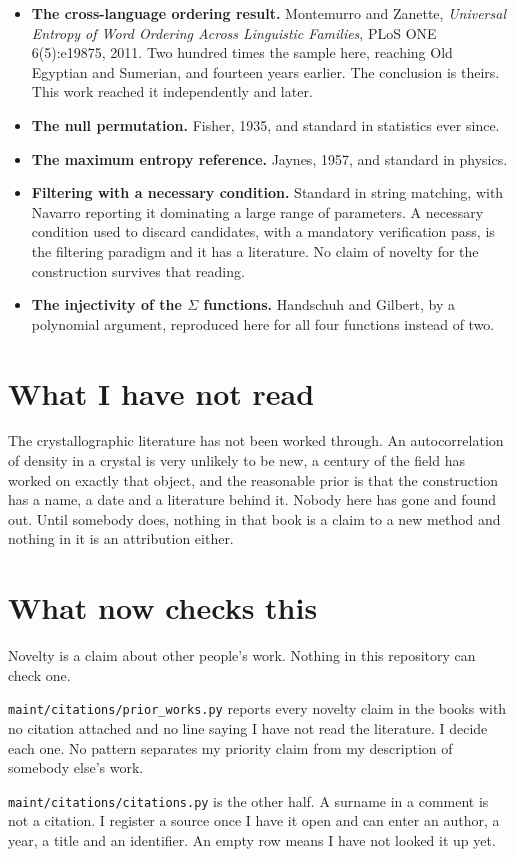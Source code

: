 \begin{itemize}
  \item \textbf{The cross-language ordering result.} Montemurro and Zanette,
    \emph{Universal Entropy of Word Ordering Across Linguistic Families}, PLoS ONE 6(5):e19875, 2011.
    Two hundred times the sample here, reaching Old Egyptian and Sumerian, and fourteen years
    earlier. The conclusion is theirs. This work reached it independently and later.
  \item \textbf{The null permutation.} Fisher, 1935, and standard in statistics ever since.
  \item \textbf{The maximum entropy reference.} Jaynes, 1957, and standard in physics.
  \item \textbf{Filtering with a necessary condition.} Standard in string matching, with Navarro
    reporting it dominating a large range of parameters. A necessary condition used to discard
    candidates, with a mandatory verification pass, is the filtering paradigm and it has a
    literature. No claim of novelty for the construction survives that reading.
  \item \textbf{The injectivity of the $\Sigma$ functions.} Handschuh and Gilbert, by a polynomial
    argument, reproduced here for all four functions instead of two.
\end{itemize}

\section*{What I have not read}

The crystallographic literature has not been worked through. An autocorrelation of density in a
crystal is very unlikely to be new, a century of the field has worked on exactly that object, and
the reasonable prior is that the construction has a name, a date and a literature behind it. Nobody
here has gone and found out. Until somebody does, nothing in that book is a claim to a new method
and nothing in it is an attribution either.

\section*{What now checks this}

Novelty is a claim about other people's work. Nothing in this repository can check one.

\texttt{maint/\allowbreak{}citations/\allowbreak{}prior\_\allowbreak{}works.\allowbreak{}py} reports
every novelty claim in the books with no citation attached and no line saying I have not read the
literature. I decide each one. No pattern separates my priority claim from my description of
somebody else's work.

\texttt{maint/\allowbreak{}citations/\allowbreak{}citations.\allowbreak{}py} is the other half. A
surname in a comment is not a citation. I register a source once I have it open and can enter an
author, a year, a title and an identifier. An empty row means I have not looked it up yet.
\cleardoublepage
